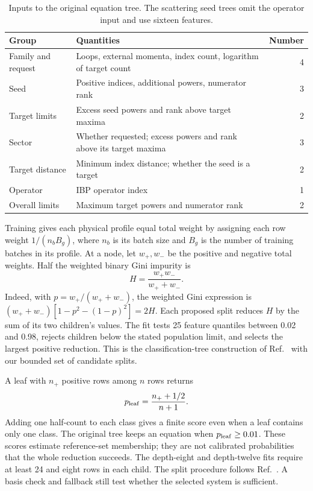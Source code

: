 \begin{table}[!htbp]
\centering\small
\caption{Inputs to the original equation tree. The scattering seed trees omit the operator input and use sixteen features.}
\label{history:tab:features}
\begin{tabularx}{\linewidth}{@{}lYr@{}}\toprule
Group & Quantities & Number\\\midrule
Family and request & Loops, external momenta, index count, logarithm of target count & 4\\
Seed & Positive indices, additional powers, numerator rank & 3\\
Target limits & Excess seed powers and rank above target maxima & 2\\
Sector & Whether requested; excess powers and rank above its target maxima & 3\\
Target distance & Minimum index distance; whether the seed is a target & 2\\
Operator & IBP operator index & 1\\
Overall limits & Maximum target powers and numerator rank & 2\\\bottomrule
\end{tabularx}
\end{table}

Training gives each physical profile equal total weight by assigning each row weight $1/(n_b B_g)$, where $n_b$ is its batch size and $B_g$ is the number of training batches in its profile. At a node, let $w_+,w_-$ be the positive and negative total weights. Half the weighted binary Gini impurity is
\begin{equation}
 H=\frac{w_+w_-}{w_++w_-}.
\end{equation}
Indeed, with $p=w_+/(w_++w_-)$, the weighted Gini expression is $(w_++w_-)[1-p^2-(1-p)^2]=2H$. Each proposed split reduces $H$ by the sum of its two children's values. The fit tests 25 feature quantiles between 0.02 and 0.98, rejects children below the stated population limit, and selects the largest positive reduction. This is the classification-tree construction of Ref.~\cite{CART1984} with our bounded set of candidate splits.

A leaf with $n_+$ positive rows among $n$ rows returns
\begin{equation}
 p_{\rm leaf}=\frac{n_++1/2}{n+1}.
\end{equation}
Adding one half-count to each class gives a finite score even when a leaf contains only one class. The original tree keeps an equation when $p_{\rm leaf}\geq0.01$. These scores estimate reference-set membership; they are not calibrated probabilities that the whole reduction succeeds. The depth-eight and depth-twelve fits require at least 24 and eight rows in each child. The split procedure follows Ref.~\cite{CART1984}. A basis check and fallback still test whether the selected system is sufficient.

